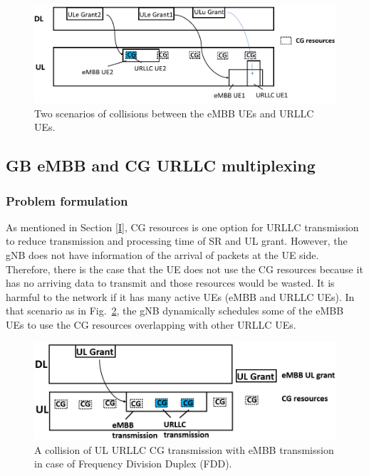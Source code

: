 \documentclass{ieeeaccess}
\begin{document}
\begin{figure}[htbp]
\centerline{\includegraphics[scale=0.33]{fig21.PNG}}
\caption{Two scenarios of collisions between the eMBB UEs and URLLC UEs.}
\label{fig21}
\end{figure}

\subsection{GB eMBB and CG URLLC multiplexing}\label{IIB}
\subsubsection{Problem formulation}\label{IIB1}
As mentioned in Section \ref{I}, CG resources is one option for URLLC transmission to reduce transmission and processing time of SR and UL grant. However, the gNB does not have information of the arrival of packets at the UE side. Therefore, there is the case that the UE does not use the CG resources because it has no arriving data to transmit and those resources would be wasted. It is harmful to the network if it has many active UEs (eMBB and URLLC UEs). In that scenario as in Fig.~\ref{fig1}, the gNB dynamically schedules some of the eMBB UEs to use the CG resources overlapping with other URLLC UEs.

\begin{figure}[htbp]
\centerline{\includegraphics[scale=0.32]{fig1.PNG}}
\caption{A collision of UL URLLC CG transmission with eMBB transmission in case of Frequency Division Duplex (FDD).}
\label{fig1}
\end{figure}
\end{document}
